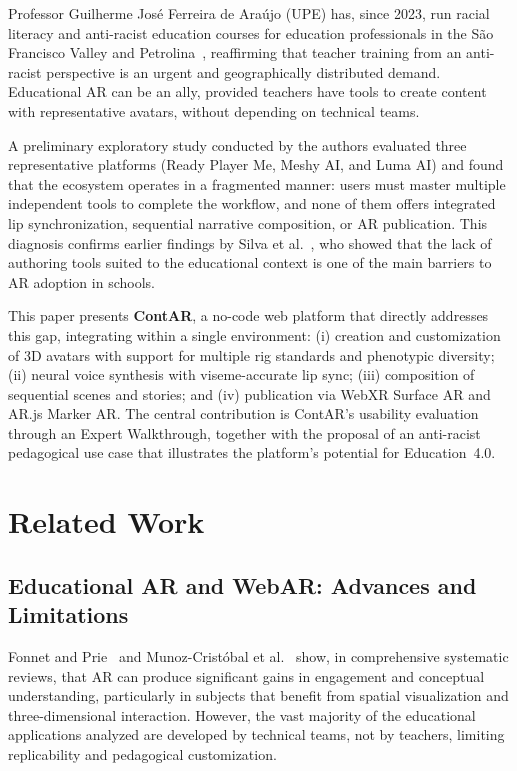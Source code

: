 \documentclass[conference]{IEEEtran}
\begin{document}
Professor Guilherme José Ferreira de Araújo (UPE) has, since 2023, run racial
literacy and anti-racist education courses for education professionals in the
São Francisco Valley and Petrolina~\cite{araujo2023a}, reaffirming that teacher
training from an anti-racist perspective is an urgent and geographically
distributed demand. Educational AR can be an ally, provided teachers have
tools to create content with representative avatars, without depending on
technical teams.

A preliminary exploratory study conducted by the authors evaluated three
representative platforms (Ready Player Me, Meshy AI, and Luma AI) and found
that the ecosystem operates in a fragmented manner: users must master multiple
independent tools to complete the workflow, and none of them offers integrated
lip synchronization, sequential narrative composition, or AR publication. This
diagnosis confirms earlier findings by Silva et al.~\cite{silva2020}, who
showed that the lack of authoring tools suited to the educational context is
one of the main barriers to AR adoption in schools.

This paper presents \textbf{ContAR}, a no-code web platform that directly
addresses this gap, integrating within a single environment: (i) creation and
customization of 3D avatars with support for multiple rig standards and
phenotypic diversity; (ii) neural voice synthesis with viseme-accurate lip
sync; (iii) composition of sequential scenes and stories; and (iv) publication
via WebXR Surface AR and AR.js Marker AR. The central contribution is
ContAR's usability evaluation through an Expert Walkthrough, together with the
proposal of an anti-racist pedagogical use case that illustrates the
platform's potential for Education~4.0.

\section{Related Work}

\subsection{Educational AR and WebAR: Advances and Limitations}

Fonnet and Prie~\cite{fonnet2021} and Munoz-Cristóbal et al.~\cite{munoz2021}
show, in comprehensive systematic reviews, that AR can produce significant
gains in engagement and conceptual understanding, particularly in subjects
that benefit from spatial visualization and three-dimensional interaction.
However, the vast majority of the educational applications analyzed are
developed by technical teams, not by teachers, limiting replicability and
pedagogical customization.
\end{document}
